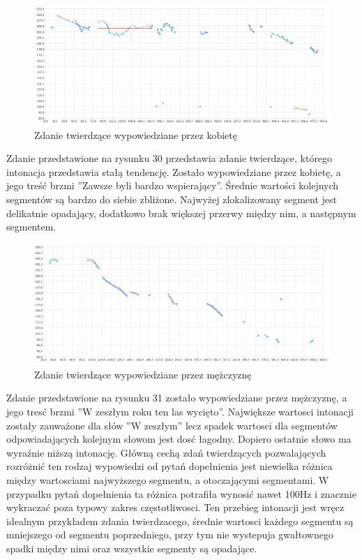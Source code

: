 \documentclass[a4paper,12 pt]{report}
\begin{document}
 \FloatBarrier
\begin{figure}[h]
\centering
\includegraphics[scale=0.6]{twierdzenie_1_kobieta.png}
\caption{Zdanie twierdzące wypowiedziane przez kobietę}
\end{figure}
\FloatBarrier
Zdanie przedstawione na rysunku 30 przedstawia zdanie twierdzące, którego intonacja przedstawia stałą tendencję. Zostało wypowiedziane przez kobietę, a jego treść brzmi ''Zawsze byli bardzo wspierający''. Średnie wartości kolejnych segmentów są bardzo do siebie zbliżone. Najwyżej zlokalizowany segment jest delikatnie opadający, dodatkowo brak większej przerwy między nim, a następnym segmentem.


 \FloatBarrier
\begin{figure}[]
\centering
\includegraphics[scale=0.6]{twierdzenie_2_mezczyzna.png}
\caption{Zdanie twierdzące wypowiedziane przez mężczyznę}
\end{figure}
\FloatBarrier

Zdanie przedstawione na rysunku 31 zostało wypowiedziane przez mężczyznę, a jego tresć brzmi ''W zeszłym roku ten las wycięto''. Największe wartosci intonacji zostały zauważone dla słów ''W zeszłym'' lecz spadek wartosci dla segmentów odpowiadających kolejnym słowom jest dosć łagodny. Dopiero ostatnie słowo ma wyraźnie niższą intonację. Główną cechą zdań twierdzących pozwalających rozróżnić ten rodzaj wypowiedzi od pytań dopełnienia jest niewielka różnica między wartosciami najwyższego segmentu, a otoczającymi segmentami. W przypadku pytań dopełnienia ta różnica potrafiła wynosić nawet 100Hz i znacznie wykraczać poza typowy zakres częstotliwosci. Ten przebieg intonacji jest wręcz idealnym przykładem zdania twierdzacego, średnie wartosci każdego segmentu są mniejszego od segmentu poprzedniego, przy tym nie wystepuja gwałtownego spadki między nimi oraz wszystkie segmenty są opadające.
\end{document}
